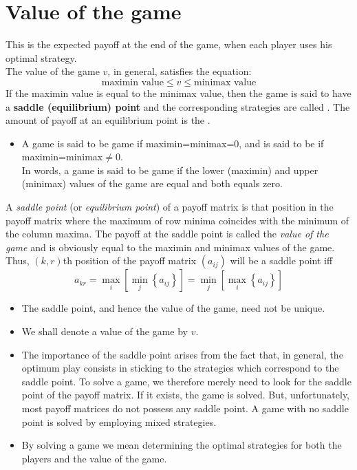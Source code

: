 \documentclass[../main-sheet.tex]{subfiles}
\begin{document}
\section{Value of the game}
This is the expected payoff at the end of the game, when each player uses his optimal strategy.\\
The value of the game \(v\), in general, satisfies the equation:
\[
    \text{maximin value}\leq v \leq \text{minimax value}
\]
If the maximin value is equal to the minimax value, then the game is said to have a \textbf{saddle (equilibrium) point} and the corresponding strategies are called . The amount of payoff at an equilibrium point is the .
\begin{itemize}
    \item A game is said to be  game if maximin=minimax=0, and is said to be  if maximin=minimax\(\neq\)0.\\
    In words, a game is said to be  game if the lower (maximin) and upper (minimax) values of the game are equal and both equals zero.
\end{itemize}
\begin{defn}
    A \emph{saddle point} (or \emph{equilibrium point}) of a payoff matrix is that position in the payoff matrix where the maximum of row minima coincides with the minimum of the column maxima. The payoff at the saddle point is called the \emph{value of the game} and is obviously equal to the maximin and minimax values of the game.\\
    Thus, \((k,r)\)th position of the payoff matrix \((a_{ij})\) will be a saddle point iff 
    \[
        a_{kr}=\max_i\left[\min_j \left\{a_{ij}\right\}\right]=\min_j\left[\max_i \left\{a_{ij}\right\}\right]
    \]
\end{defn}
\begin{rem}\hfill
    \begin{itemize}
        \item The saddle point, and hence the value of the game, need not be unique.
        \item We shall denote a value of the game by \(v\).
        \item The importance of the saddle point arises from the fact that, in general, the optimum play consists in sticking to the strategies which correspond to the saddle point. To solve a game, we therefore merely need to look for the saddle point of the payoff matrix. If it exists, the game is solved. But, unfortunately, most payoff matrices do not possess any saddle point. A game with no saddle point is solved by employing mixed strategies.
        \item By solving a game we mean determining the optimal strategies for both the players and the value of the game.
    \end{itemize}
\end{rem}
\end{document}
